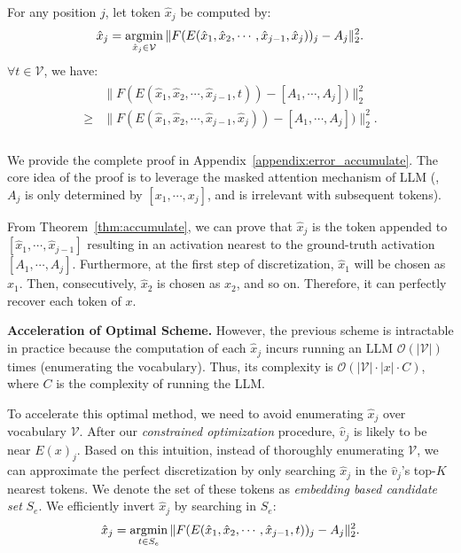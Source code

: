 \begin{theorem}
\label{thm:accumulate}
For any position $j$, let  token $\hat{x}_j$ be computed by:
\begin{align}
\label{eq:sj_def}
\hat{x}_j=\operatorname*{argmin}_{\hat{x}_j\in \mathcal{V}}\| F(E(\hat{x}_1,\hat{x}_2,\cdots,\hat{x}_{j-1},\hat{x}_j))_j-A_j \|_2^2 .
\end{align}
$\forall t \in \mathcal{V}$, we have:
\begin{align}
    \begin{aligned}\label{eq:thm2_proof_target}
       &  \| F(E(\hat{x}_1,\hat{x}_2,\cdots,\hat{x}_{j-1},t))-[A_1,\cdots,A_j]) \|_2^2 \\
      \ge  &  \| F(E(\hat{x}_1,\hat{x}_2,\cdots,\hat{x}_{j-1},\hat{x}_j))-[A_1,\cdots,A_j]) \|_2^2 .\\
\end{aligned}
\end{align}


\end{theorem}

We provide the complete proof in Appendix~\ref{appendix:error_accumulate}. The core idea of the proof is to leverage the masked attention mechanism of LLM (\ie, $A_j$ is only determined by $[x_1,\cdots,x_j]$, and is irrelevant with subsequent tokens).

From Theorem~\ref{thm:accumulate}, we can prove that $\hat{x}_j$ is the token  appended to $[\hat{x}_1,\cdots,\hat{x}_{j-1}]$ resulting in an activation nearest to the ground-truth activation $[A_1,\cdots,A_j]$.  Furthermore, at the first step of discretization, $\hat{x}_1$ will be chosen as $x_1$. Then, consecutively, $\hat{x}_2$ is chosen as $x_2$, and so on. Therefore, it can perfectly recover each token of $x$. 




\noindent \textbf{Acceleration of Optimal Scheme.} However, the previous scheme is intractable in practice because the computation of each $\hat{x}_j$ incurs running an LLM $\mathcal{O}(|\mathcal{V}|)$ times (enumerating the vocabulary). Thus, its complexity is $\mathcal{O}(|\mathcal{V}|\cdot |x| \cdot C)$, where $C$ is the complexity of running the LLM. 

To accelerate this optimal method, we need to avoid enumerating $\hat{x}_j$ over vocabulary $\mathcal{V}$. After  our \textit{constrained optimization} procedure, $\hat{v}_j$ is likely to be near $E(x)_j$. Based on this intuition, instead of thoroughly enumerating $\mathcal{V}$, we can approximate the perfect discretization by only searching $\hat{x}_j$ in the  $\hat{v}_j$'s top-$K$ nearest tokens. We denote the set of these tokens as \textit{embedding based candidate set} $S_e$. We efficiently invert $\hat{x}_j$ by searching in $S_e$:
\begin{align}
\label{eq:discretize_practical}
    \hat{x}_j=\operatorname*{argmin}_{t\in S_e}\| F(E(\hat{x}_1,\hat{x}_2,\cdots,\hat{x}_{j-1},t))_j-A_j \|_2^2 .
\end{align}






